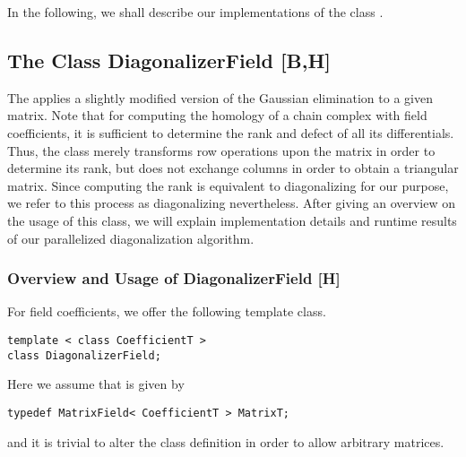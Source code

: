In the following, we shall describe our implementations of the class .

\subsection{The Class DiagonalizerField [B,H]}
\label{program:libhomology:DiagonalizerT:DiagonalizerField}

The  applies a slightly modified version of the Gaussian elimination to a given matrix.
Note that for computing the homology of a chain complex with field coefficients,
it is sufficient to determine the rank and defect of all its differentials.
Thus, the class  merely transforms row operations upon the matrix in order to determine its rank,
but does not exchange columns in order to obtain a triangular matrix.
Since computing the rank is equivalent to diagonalizing for our purpose, we refer to this process as diagonalizing nevertheless.
After giving an overview on the usage of this class, we will explain implementation details and runtime results of our parallelized diagonalization algorithm.

\subsubsection{Overview and Usage of DiagonalizerField [H]}

For field coefficients, we offer the following template class.
\begin{lstlisting}
template < class CoefficientT >
class DiagonalizerField;
\end{lstlisting}
Here we assume that  is given by
\begin{lstlisting}
typedef MatrixField< CoefficientT > MatrixT;
\end{lstlisting}
and it is trivial to alter the class definition in order to allow arbitrary matrices.

